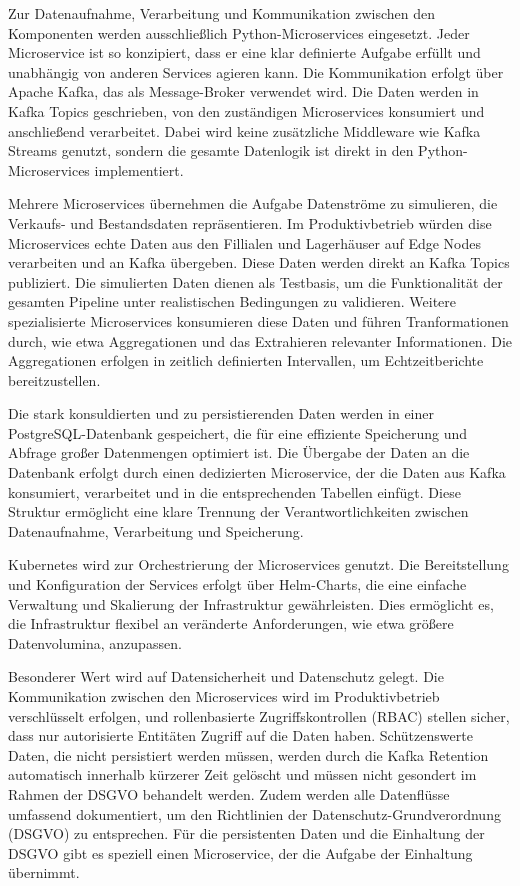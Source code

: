 \documentclass[%
pdftex,
oneside,			%
11pt,				%
parskip=half,		%
headheight = 12pt,	%
headsepline,		%
footsepline,		%
footheight = 16pt,	%
abstracton,		%
DIV=calc,		%
BCOR=8mm,		%
headinclude=false,	%
footinclude=false,	%
listof=totoc,		%
toc=bibliography,	%
]{scrreprt}	%
\begin{document}
    Zur Datenaufnahme, Verarbeitung und Kommunikation zwischen den Komponenten werden ausschließlich Python-Microservices eingesetzt.
    Jeder Microservice ist so konzipiert, dass er eine klar definierte Aufgabe erfüllt und unabhängig von anderen Services agieren kann.
    Die Kommunikation erfolgt über Apache Kafka, das als Message-Broker verwendet wird.
    Die Daten werden in Kafka Topics geschrieben, von den zuständigen Microservices konsumiert und anschließend verarbeitet.
    Dabei wird keine zusätzliche Middleware wie Kafka Streams genutzt, sondern die gesamte Datenlogik ist direkt in den Python-Microservices implementiert.

    Mehrere Microservices übernehmen die Aufgabe Datenströme zu simulieren, die Verkaufs- und Bestandsdaten repräsentieren.
    Im Produktivbetrieb würden dise Microservices echte Daten aus den Fillialen und Lagerhäuser auf Edge Nodes verarbeiten und an Kafka übergeben.
    Diese Daten werden direkt an Kafka Topics publiziert.
    Die simulierten Daten dienen als Testbasis, um die Funktionalität der gesamten Pipeline unter realistischen Bedingungen zu validieren.
    Weitere spezialisierte Microservices konsumieren diese Daten und führen Tranformationen durch, wie etwa Aggregationen und das Extrahieren relevanter Informationen.
    Die Aggregationen erfolgen in zeitlich definierten Intervallen, um Echtzeitberichte bereitzustellen.

    Die stark konsuldierten und zu persistierenden Daten werden in einer PostgreSQL-Datenbank gespeichert, die für eine effiziente Speicherung und Abfrage großer Datenmengen optimiert ist.
    Die Übergabe der Daten an die Datenbank erfolgt durch einen dedizierten Microservice, der die Daten aus Kafka konsumiert, verarbeitet und in die entsprechenden Tabellen einfügt.
    Diese Struktur ermöglicht eine klare Trennung der Verantwortlichkeiten zwischen Datenaufnahme, Verarbeitung und Speicherung.

    Kubernetes wird zur Orchestrierung der Microservices genutzt.
    Die Bereitstellung und Konfiguration der Services erfolgt über Helm-Charts, die eine einfache Verwaltung und Skalierung der Infrastruktur gewährleisten.
    Dies ermöglicht es, die Infrastruktur flexibel an veränderte Anforderungen, wie etwa größere Datenvolumina, anzupassen.

    Besonderer Wert wird auf Datensicherheit und Datenschutz gelegt.
    Die Kommunikation zwischen den Microservices wird im Produktivbetrieb verschlüsselt erfolgen, und rollenbasierte Zugriffskontrollen (RBAC) stellen sicher, dass nur autorisierte Entitäten Zugriff auf die Daten haben. %
    Schützenswerte Daten, die nicht persistiert werden müssen, werden durch die Kafka Retention automatisch innerhalb kürzerer Zeit gelöscht und müssen nicht gesondert im Rahmen der DSGVO behandelt werden.
    Zudem werden alle Datenflüsse umfassend dokumentiert, um den Richtlinien der Datenschutz-Grundverordnung (DSGVO) zu entsprechen.
    Für die persistenten Daten und die Einhaltung der DSGVO gibt es speziell einen Microservice, der die Aufgabe der Einhaltung übernimmt.
\end{document}
